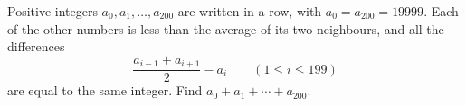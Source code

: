 Positive integers $a_0,a_1,\ldots,a_{200}$ are written in a row, with $a_0=a_{200}=19999$. Each of the other numbers is less than the average of its two neighbours, and all the differences
\[\dfrac{a_{i-1}+a_{i+1}}{2}-a_i\qquad(1\le i\le199)\]
are equal to the same integer. Find $a_0+a_1+\cdots+a_{200}$.
